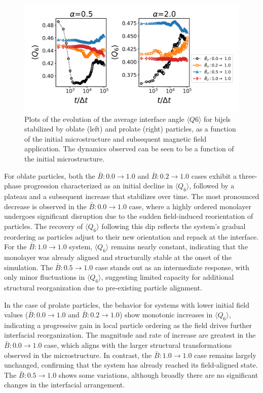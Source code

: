 \begin{figure} 
    \centering 
    \includegraphics[scale=0.4]{../figures/results/paper2/Q6-field_up.png} 
    \caption{Plots of the evolution of the average interface angle \(\langle Q6 \rangle\) for bijels stabilized 
             by oblate (left) and prolate (right) particles, as a function of the initial microstructure and subsequent magnetic field application.
             The dynamics observed can be seen to be a function of the initial microstructure.} 
    \label{fig:Q6-field_up} 
\end{figure}

For oblate particles, both the \(\bar{B}: 0.0 \rightarrow 1.0\) and 
\(\bar{B}: 0.2 \rightarrow 1.0\) cases exhibit a three-phase progression characterized as an initial decline in \(\langle Q_6 \rangle\), followed by a 
plateau and a subsequent increase that stabilizes over time. The most pronounced decrease is observed in the \(\bar{B}: 0.0 \rightarrow 1.0\) case, where a 
highly ordered monolayer undergoes significant disruption due to the sudden field-induced reorientation of particles. The recovery of \(\langle Q_6 \rangle\) 
following this dip reflects the system's gradual reordering as particles adjust to their new orientation and repack at the interface.
For the \(\bar{B}: 1.0 \rightarrow 1.0\) system, \(\langle Q_6 \rangle\) remains nearly constant, indicating that the monolayer was already aligned and 
structurally stable at the onset of the simulation. The \(\bar{B}: 0.5 \rightarrow 1.0\) case stands out as an intermediate response, with only minor 
fluctuations in \(\langle Q_6 \rangle\), suggesting limited capacity for additional structural reorganization due to pre-existing particle alignment.

In the case of prolate particles, the behavior for systems with lower initial field values (\(\bar{B}: 0.0 \rightarrow 1.0\) 
and \(\bar{B}: 0.2 \rightarrow 1.0\)) show monotonic increases in \(\langle Q_6 \rangle\), indicating a progressive gain in local particle ordering as the 
field drives further interfacial reorganization. The magnitude and rate of increase are greatest in the \(\bar{B}: 0.0 \rightarrow 1.0\) case, which aligns with 
the larger structural transformations observed in the microstructure. In contrast, the \(\bar{B}: 1.0 \rightarrow 1.0\) case remains largely unchanged, 
confirming that the system has already reached its field-aligned state. The $\bar{B}: 0.5 \rightarrow 1.0$ shows some variations, although broadly there are no
significant changes in the interfacial arrangement. 

